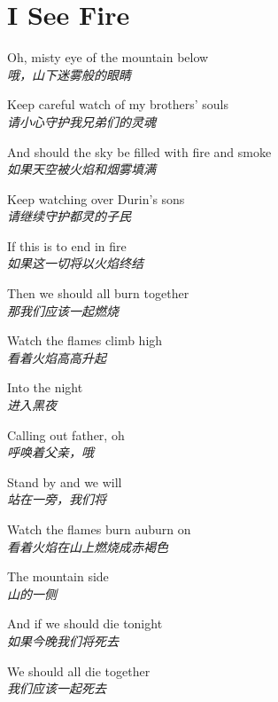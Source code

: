\section{I See Fire}

\thispagestyle{empty}


\begin{spacing}{1.5}
\begin{flushleft}
Oh, misty eye of the mountain below\\
\textit{哦，山下迷雾般的眼睛}\lyricspace

Keep careful watch of my brothers' souls\\
\textit{请小心守护我兄弟们的灵魂}\lyricspace

And should the sky be filled with fire and smoke\\
\textit{如果天空被火焰和烟雾填满}\lyricspace

Keep watching over Durin's sons\\
\textit{请继续守护都灵的子民}\lyricspace

If this is to end in fire\\
\textit{如果这一切将以火焰终结}\lyricspace

Then we should all burn together\\
\textit{那我们应该一起燃烧}\lyricspace

Watch the flames climb high\\
\textit{看着火焰高高升起}\lyricspace

Into the night\\
\textit{进入黑夜}\lyricspace

Calling out father, oh\\
\textit{呼唤着父亲，哦}\lyricspace

Stand by and we will\\
\textit{站在一旁，我们将}\lyricspace

Watch the flames burn auburn on\\
\textit{看着火焰在山上燃烧成赤褐色}\lyricspace

The mountain side\\
\textit{山的一侧}\lyricspace

And if we should die tonight\\
\textit{如果今晚我们将死去}\lyricspace

We should all die together\\
\textit{我们应该一起死去}\lyricspace


\end{flushleft}
\end{spacing}
